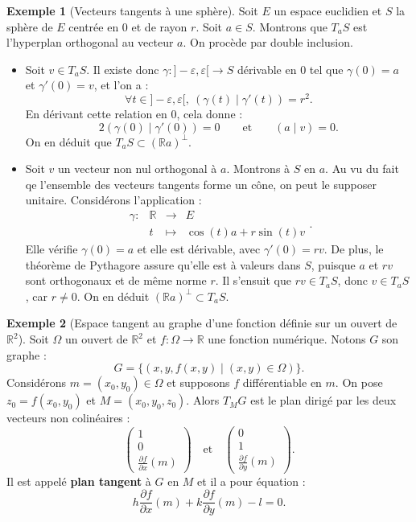 \documentclass[french]{article}
\newcommand{\R}{\mathbb{R}}
\theoremstyle{plain}
\theoremstyle{definition}
\newtheorem*{ex}{Exemple}
\theoremstyle{remark}
\begin{document}
\begin{ex}[Vecteurs tangents à une sphère]
	Soit $E$ un espace euclidien et $S$ la sphère de $E$ centrée en $0$ et de rayon $r$. Soit $a\in S$. Montrons que $T_aS$ est l'hyperplan orthogonal au vecteur $a$. On procède par double inclusion.
	\begin{itemize}
		\item Soit $v\in T_aS$. Il existe donc $\gamma:]-\varepsilon,\varepsilon[\to S$ dérivable en $0$ tel que $\gamma(0)=a$ et $\gamma'(0)=v$, et l'on a :
		$$\forall t\in]-\varepsilon,\varepsilon[,\ (\gamma(t)\mid\gamma'(t))=r^2.$$
		En dérivant cette relation en $0$, cela donne :
		$$2(\gamma(0)\mid\gamma'(0))=0\quad\quad\text{et}\quad\quad (a\mid v)=0.$$
		On en déduit que $T_aS\subset(\R a)^\bot$.
		\item Soit $v$ un vecteur non nul orthogonal à $a$. Montrons à $S$ en $a$. Au vu du fait qe l'ensemble des vecteurs tangents forme un cône, on peut le supposer unitaire. Considérons l'application :
		$$\begin{array}{lrcl}
			\gamma:&\R&\longrightarrow&E\\
			&t&\longmapsto&\cos(t)a+r\sin(t)v
		\end{array}.$$
		Elle vérifie $\gamma(0)=a$ et elle est dérivable, avec $\gamma'(0)=rv$. De plus, le théorème de Pythagore assure qu'elle est à valeurs dans $S$, puisque $a$ et $rv$ sont orthogonaux et de même norme $r$. Il s'ensuit que $rv\in T_aS$, donc $v\in T_aS$, car $r\ne0$. On en déduit $(\R a)^\bot\subset T_aS$.
	\end{itemize}
\end{ex}

\begin{ex}[Espace tangent au graphe d'une fonction définie sur un ouvert de $\R^2$]
	Soit $\Omega$ un ouvert de $\R^2$ et $f:\Omega\to\R$ une fonction numérique. Notons $G$ son graphe :
	$$G=\{(x,y,f(x,y)\mid (x,y)\in\Omega)\}.$$
	Considérons $m=(x_0,y_0)\in\Omega$ et supposons $f$ différentiable en $m$. On pose $z_0=f(x_0,y_0)$ et $M=(x_0,y_0,z_0)$. Alors $T_MG$ est le plan dirigé par les deux vecteurs non colinéaires :
	$$\begin{pmatrix}
		1\\
		0\\[2mm]
		\frac{\partial f}{\partial x}(m)
	\end{pmatrix}\quad\text{et}\quad\begin{pmatrix}
	0\\
	1\\[2mm]
	\frac{\partial f}{\partial y}(m)
	\end{pmatrix}.$$
	Il est appelé \textbf{plan tangent} à $G$ en $M$ et il a pour équation :
	$$h\frac{\partial f}{\partial x}(m)+k\frac{\partial f}{\partial y}(m)-l=0.$$
\end{ex}
\end{document}

